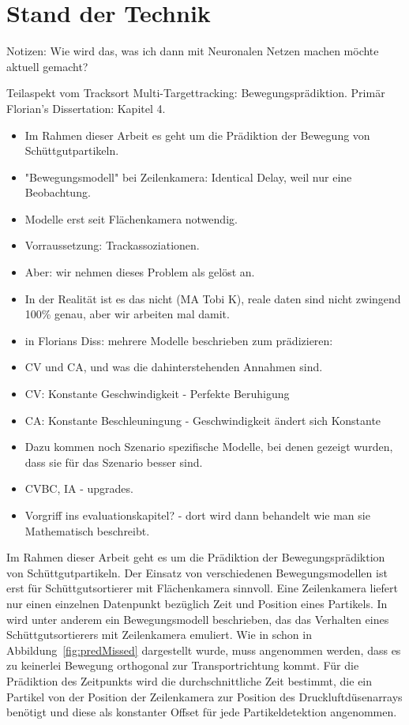 \section{Stand der Technik}
\label{cap:relWork}

Notizen:
\color{blue}
Wie wird das, was ich dann mit Neuronalen Netzen machen möchte aktuell gemacht?


Teilaspekt vom Tracksort Multi-Targettracking: Bewegungsprädiktion.
Primär Florian's Dissertation: Kapitel 4.


\begin{itemize}
    \item Im Rahmen dieser Arbeit es geht um die Prädiktion der Bewegung von Schüttgutpartikeln.
    \item "Bewegungsmodell" bei Zeilenkamera: Identical Delay, weil nur eine Beobachtung.
    \item Modelle erst seit Flächenkamera notwendig.
    \item Vorraussetzung: Trackassoziationen.
    \item Aber: wir nehmen dieses Problem als gelöst an.
    \item In der Realität ist es das nicht (MA Tobi K), reale daten sind nicht zwingend 100\% genau, aber wir arbeiten mal damit.
    \item in Florians Diss: mehrere Modelle beschrieben zum prädizieren:
    \item CV und CA, und was die dahinterstehenden Annahmen sind.
    \item CV: Konstante Geschwindigkeit - Perfekte Beruhigung
    \item CA: Konstante Beschleuningung - Geschwindigkeit ändert sich Konstante
    \item Dazu kommen noch Szenario spezifische Modelle, bei denen gezeigt wurden, dass sie für das Szenario besser sind.
    \item CVBC, IA - upgrades.
    \item Vorgriff ins evaluationskapitel? - dort wird dann behandelt wie man sie Mathematisch beschreibt. 
\end{itemize}

\color{black}


Im Rahmen dieser Arbeit geht es um die Prädiktion der Bewegungsprädiktion von Schüttgutpartikeln.
Der Einsatz von verschiedenen Bewegungsmodellen ist erst für Schüttgutsortierer mit Flächenkamera sinnvoll.
Eine Zeilenkamera liefert nur einen einzelnen Datenpunkt bezüglich Zeit und Position eines Partikels.
In~\cite{Pfaff2018} wird unter anderem ein Bewegungsmodell beschrieben, das das Verhalten eines Schüttgutsortierers mit Zeilenkamera emuliert.
Wie in schon in Abbildung~\ref{fig:predMissed} dargestellt wurde, muss angenommen werden, dass es zu keinerlei Bewegung orthogonal zur Transportrichtung kommt.
Für die Prädiktion des Zeitpunkts wird die durchschnittliche Zeit bestimmt, die ein Partikel von der Position der Zeilenkamera zur Position des Druckluftdüsenarrays benötigt 
und diese als konstanter Offset für jede Partikeldetektion angenommen.

